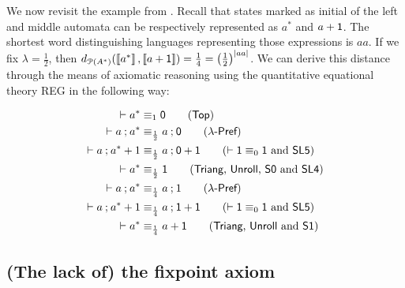 We now revisit the example from . Recall that states marked as initial of the left and middle automata can be respectively represented as $a^\ast$ and $a + \mathsf{1}$. The shortest word distinguishing languages representing those expressions is $aa$. If we fix $\lambda = \frac{1}{2}$, then $d_{\mathcal{P}({A}^{\ast})}(\left\llbracket{a^\ast}\right\rrbracket, \left\llbracket{a+ \mathsf{1}}\right\rrbracket) = \frac{1}{4}=\left(\frac{1}{2}\right)^{|aa|}$. We can derive this distance through the means of axiomatic reasoning using the quantitative equational theory \textsf{REG} in the following way: 
\begin{example}
 	\begin{align*}
		\vdash a^* &\equiv_1 \zero \tag{$\Top$} \\
		\vdash a \seq a^{\ast} &\equiv_{\frac{1}{2}} a \seq \zero\tag{$\dPref$}\\
		\vdash a \seq a^\ast + 1&\equiv_{\frac{1}{2}} a \seq \zero + \one  \tag{$\vdash \one \equiv_0 \one$ and \textsf{SL5}}\\
		\vdash a^{\ast} &\equiv_{\frac{1}{2}} \one \tag{$\Triang$, \textsf{Unroll}, \textsf{S0} and \textsf{SL4}}\\
		\vdash a \seq a^\ast &\equiv_{\frac{1}{4}} a \seq 1 \tag{$\dPref$}\\
		\vdash a \seq a^\ast + 1 &\equiv_{\frac{1}{4}} a \seq \one + \one  \tag{$\vdash \one \equiv_0 \one$ and \textsf{SL5}}\\
		\vdash a^\ast &\equiv_{\frac{1}{4}} a + \one \tag{$\Triang$, \textsf{Unroll} and \textsf{S1}}\\
	\end{align*}
\end{example}
\subsection{(The lack of) the fixpoint axiom}\label{c2:subsec:fixpoint_axiom}

